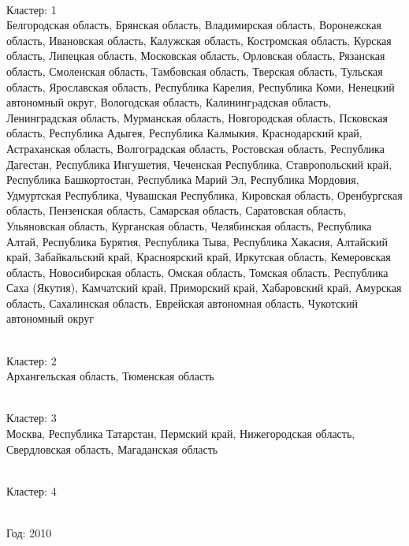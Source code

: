 \documentclass[11pt]{article}
\begin{document}
\newline \\ Кластер:  1
\\ Белгородская область, Брянская область, Владимирская область, Воронежская область, Ивановская область, Калужская область, Костромская область, Курская область, Липецкая область, Московская область, Орловская область, Рязанская область, Смоленская область, Тамбовская область, Тверская область, Тульская область, Ярославская область, Республика Карелия, Республика Коми, Ненецкий автономный округ, Вологодская область, Калинингpадская область, Ленинградская область, Мурманская область, Новгородская область, Псковская область, Республика Адыгея, Республика Калмыкия, Краснодарский край, Астраханская область, Волгоградская область, Ростовская область, Республика Дагестан, Республика Ингушетия, Чеченская Республика, Ставропольский край, Республика Башкортостан, Республика Марий Эл, Республика Мордовия, Удмуртская Республика, Чувашская Республика, Кировская область, Оренбургская область, Пензенская область, Самарская область, Саратовская область, Ульяновская область, Курганская область, Челябинская область, Республика Алтай, Республика Бурятия, Республика Тыва, Республика Хакасия, Алтайский край, Забайкальский край, Красноярский край, Иркутская область, Кемеровская область, Новосибирская область, Омская область, Томская область, Республика Саха (Якутия), Камчатский край, Приморский край, Хабаровский край, Амурская область, Сахалинская область, Еврейская автономная область, Чукотский автономный округ

\newline \\ Кластер:  2
\\ Архангельская область, Тюменская область

\newline \\ Кластер:  3
\\ Москва, Республика Татарстан, Пермский край, Нижегородская область, Свердловская область, Магаданская область

\newline \\ Кластер:  4



\newline \newline \\ Год:  2010
\end{document}
